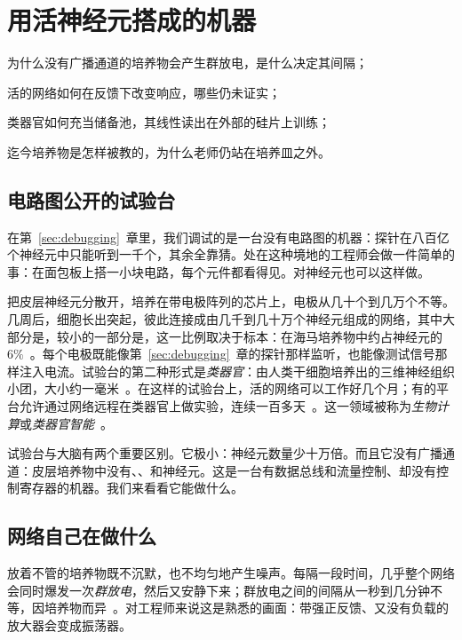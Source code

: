 \chapter{用活神经元搭成的机器}
\label{sec:livingmachine}
\begin{chaptergoals}
\item 为什么没有广播通道的培养物会产生群放电，是什么决定其间隔；
\item 活的网络如何在反馈下改变响应，哪些仍未证实；
\item 类器官如何充当储备池，其线性读出在外部的硅片上训练；
\item 迄今培养物是怎样被教的，为什么老师仍站在培养皿之外。
\end{chaptergoals}

\section{电路图公开的试验台}

在第~\ref{sec:debugging}~章里，我们调试的是一台没有电路图的机器：探针在八百亿个神经元中只能听到一千个，其余全靠猜。处在这种境地的工程师会做一件简单的事：在面包板上搭一小块电路，每个元件都看得见。对神经元也可以这样做。

把皮层神经元分散开，培养在带电极阵列的芯片上，电极从几十个到几万个不等。几周后，细胞长出突起，彼此连接成由几千到几十万个神经元组成的网络，其中大部分是，较小的一部分是，这一比例取决于标本：在海马培养物中约占神经元的 $6\%$~\cite{Benson1994}。每个电极既能像第~\ref{sec:debugging}~章的探针那样监听，也能像测试信号那样注入电流。试验台的第二种形式是\emph{类器官}：由人类干细胞培养出的三维神经组织小团，大小约一毫米~\cite{Lancaster2013}。在这样的试验台上，活的网络可以工作好几个月；有的平台允许通过网络远程在类器官上做实验，连续一百多天~\cite{Jordan2024}。这一领域被称为\emph{生物计算}或\emph{类器官智能}~\cite{Smirnova2023}。

试验台与大脑有两个重要区别。它极小：神经元数量少十万倍。而且它没有广播通道：皮层培养物中没有、、和神经元。这是一台有数据总线和流量控制、却没有控制寄存器的机器。我们来看看它能做什么。

\section{网络自己在做什么}

放着不管的培养物既不沉默，也不均匀地产生噪声。每隔一段时间，几乎整个网络会同时爆发一次\emph{群放电}，然后又安静下来；群放电之间的间隔从一秒到几分钟不等，因培养物而异~\cite{Wagenaar2006}。对工程师来说这是熟悉的画面：带强正反馈、又没有负载的放大器会变成振荡器。

